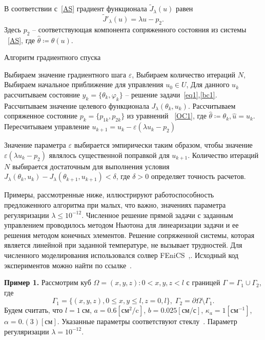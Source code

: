 В соответствии с~\eqref{AS} градиент функционала $\tilde J_\lambda(u)$ равен
\[ \tilde J'_\lambda (u) = \lambda u - p_2. \]
Здесь $p_2$ -- соответствующая компонента сопряженного состояния из системы ~\eqref{AS},
где $\hat{\theta}\coloneqq\theta(u)$.

\begin{algorithm}[H]
    \caption{Алгоритм градиентного спуска}
    \label{alg:algorithm}
    \begin{algorithmic}[1]
        \State Выбираем значение градиентного шага $\varepsilon$,
        \State Выбираем количество итераций $N$,
        \State Выбираем начальное приближение для управления $u_0 \in U$,
            \State Для данного $u_k$ рассчитываем состояние $y_k = \{\theta_k, \varphi_k\}$ --
            решение задачи~\eqref{eq1},\eqref{bc1}.
            \State Рассчитываем значение целевого функционала $J_\lambda(\theta_k, u_k)$.
            \State Рассчитываем сопряженное состояние $p_k=\{p_{1k},p_{2k}\}$ из уравнений ~\eqref{OC1},
            где $ \hat{\theta} \coloneqq \theta_k, \hat{u}=u_k$.
            \State Пересчитываем управление $u_{k+1} = u_k - \varepsilon (\lambda u_k - p_2)$
        \EndFor
    \end{algorithmic}
\end{algorithm}
Значение параметра $\varepsilon$ выбирается эмпирически таким образом, чтобы значение
$\varepsilon (\lambda u_k - p_2)$ являлось существенной поправкой для $u_{k+1}$.
Количество итераций $N$ выбирается достаточным для выполнения условия
$J_\lambda(\theta_k, u_k) - J_\lambda(\theta_{k+1}, u_{k+1}) < \delta$, где $\delta>0$
определяет точность расчетов.

Примеры, рассмотренные ниже, иллюстрируют работоспособность предложенного алгоритма при малых, что важно, значениях параметра регуляризации $\lambda \leq 10^{-12}$.
Численное решение прямой задачи с заданным управлением проводилось
методом Ньютона для линеаризации задачи и ее решения методом конечных элементов.
Решение сопряженной системы, которая является линейной при заданной температуре, не вызывает трудностей.
Для численного моделирования использовался солвер FEniCS~\cite{fenics},\cite{dolfin}.
Исходный код экспериментов можно найти по ссылке~\cite{mesenev-github}.

\textbf{Пример 1.}
Рассмотрим куб $\Omega = {(x, y, z): 0 < x,y,z < l}$ с границей $\Gamma = \Gamma_1 \cup \Gamma_2$, где
\[
    \Gamma_1 = \{(x, y, z), 0 \leq x,y \leq l, z= 0, l\}, \;
    \Gamma_2 = \partial \Omega \setminus \Gamma_1.
\]
Будем считать, что
$l = 1~\text{см}$,
$a = 0.6[\text{см}^2/\text{c}]$,
$b = 0.025[\text{см}/\text{с}]$,
$\kappa_a = 1[\text{см}^{-1}]$,
$\alpha = 0.(3)[\text{см}]$.
Указанные параметры соответствуют стеклу~\cite{Grenkin5}.
Параметр регуляризации $\lambda=10^{-12}$.

